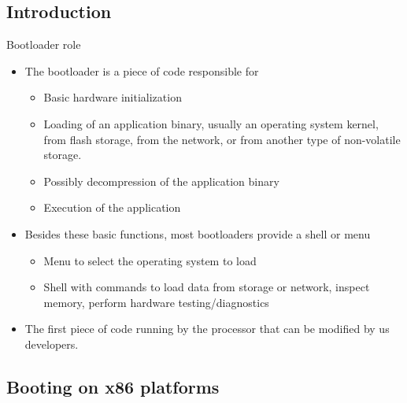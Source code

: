 \subsection{Introduction}

\begin{frame}{Bootloader role}
  \begin{itemize}
  \item The bootloader is a piece of code responsible for
    \begin{itemize}
    \item Basic hardware initialization
    \item Loading of an application binary, usually an operating
      system kernel, from flash storage, from the network, or from
      another type of non-volatile storage.
    \item Possibly decompression of the application binary
    \item Execution of the application
    \end{itemize}
  \item Besides these basic functions, most bootloaders provide a
    shell or menu
    \begin{itemize}
    \item Menu to select the operating system to load
    \item Shell with commands to load data from storage or network,
      inspect memory, perform hardware testing/diagnostics
    \end{itemize}
  \item The first piece of code running by the processor that can be
    modified by us developers.
  \end{itemize}
\end{frame}

\subsection{Booting on x86 platforms}

